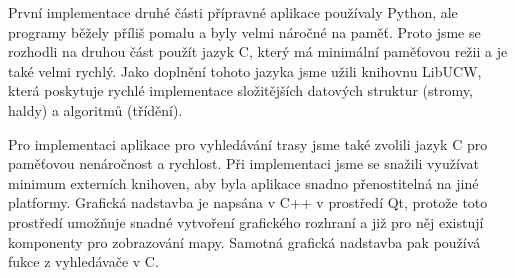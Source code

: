 První implementace druhé části přípravné aplikace používaly Python, ale programy
běžely příliš pomalu a byly velmi náročné na paměť. Proto jsme se rozhodli na
druhou část použít jazyk C, který má minimální paměťovou režii a je také velmi
rychlý. Jako doplnění tohoto jazyka jsme užili knihovnu LibUCW, která poskytuje
rychlé implementace složitějších datových struktur (stromy, haldy) a algoritmů
(třídění). 

Pro implementaci aplikace pro vyhledávání trasy jsme také zvolili jazyk C pro
paměťovou nenáročnost a rychlost. Při implementaci jsme se snažili využívat
minimum externích knihoven, aby byla aplikace snadno přenostitelná na jiné
platformy. Grafická nadstavba je napsána v C++ v prostředí Qt, protože toto
prostředí umožňuje snadné vytvoření grafického rozhraní a již pro něj existují
komponenty pro zobrazování mapy. Samotná grafická nadstavba pak používá fukce z
vyhledávače v C.


